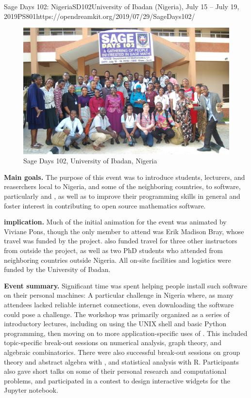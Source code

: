 \begin{event}{Sage Days 102: Nigeria}{SD102}{University of Ibadan (Nigeria), July 15 -- July 19, 2019}{PS}{80}{1}{https://opendreamkit.org/2019/07/29/SageDays102/}

\begin{figure}[ht]
  \includegraphics[width=.75\textwidth]{days102_group.jpg}
  \caption*{Sage Days 102, University of Ibadan, Nigeria}
\end{figure}

\textbf{Main goals.} The purpose of this event was to introduce students,
lecturers, and reaserchers local to Nigeria, and some of the
neighboring countries, to \ODK software, particularly \Sage and \GAP,
as well as to improve their programming skills in general and foster
interest in contributing to open source mathematics software.

\textbf{\ODK implication.} Much of the initial animation for the event was
animated by Viviane Pons, though the only \ODK member to attend was
Erik Madison Bray, whose travel was funded by the project.  \ODK also
funded travel for three other instructors from outside the project, as
well as two PhD students who attended from neighboring countries
outside Nigeria.  All on-site facilities and logistics were funded by the
University of Ibadan.

\textbf{Event summary.} Significant time was spent helping people install such
software on their personal machines: A particular challenge in Nigeria
where, as many attendees lacked reliable internet connections, even
downloading the software could pose a challenge.  The workshop was
primarily organized as a series of introductory lectures, including on
using the UNIX shell and basic Python programming, then moving on to
more application-specific uses of \Sage.  This included
topic-specific break-out sessions on numerical analysis, graph
theory, and algebraic combinatorics.  There were also successful
break-out sessions on group theory and abstract algebra with \GAP, and
statistical analysis with R. Participants also gave short talks on some
of their personal research and computational problems, and
participated in a contest to design interactive widgets for the Jupyter
notebook.


\end{event}
